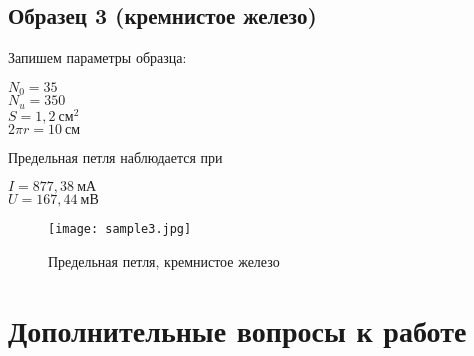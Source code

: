 \newpage



\subsection{Образец 3 (кремнистое железо)}

Запишем параметры образца:

\begin{center}
	$N_0 = 35$                   \\
	$N_u = 350$                  \\
	$S = 1,2 ~ \text{см}^2$      \\
	$2 \pi r = 10 ~ \text{см}$
\end{center}

Предельная петля наблюдается при 

\begin{center}
	$I = 877,38 ~ \text{мА}$ \\
	$U = 167,44 ~ \text{мВ}$
\end{center}

\begin{figure}
	\centering
	\texttt{[image: sample3.jpg]}
	\caption{Предельная петля, кремнистое железо}
	\label{sample3_pic}	
\end{figure}

\section{Дополнительные вопросы к работе}

